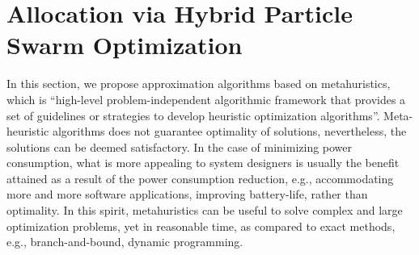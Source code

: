 



\section*{Allocation via Hybrid Particle Swarm Optimization}\label{rc_pso}
In this section, we propose approximation algorithms based on metahuristics, which is ``high-level problem-independent algorithmic framework that provides a set of guidelines or strategies to develop heuristic optimization algorithms''. Meta-heuristic algorithms does not guarantee optimality of solutions, nevertheless, the solutions can be deemed satisfactory. In the case of minimizing power consumption, what is more appealing to system designers is usually the benefit attained as a result of the power consumption reduction, e.g., accommodating more and more software applications, improving battery-life, rather than optimality. In this spirit, metahuristics can be useful to solve complex and large optimization problems, yet in reasonable time, as compared to exact methods, e.g., branch-and-bound, dynamic programming.

